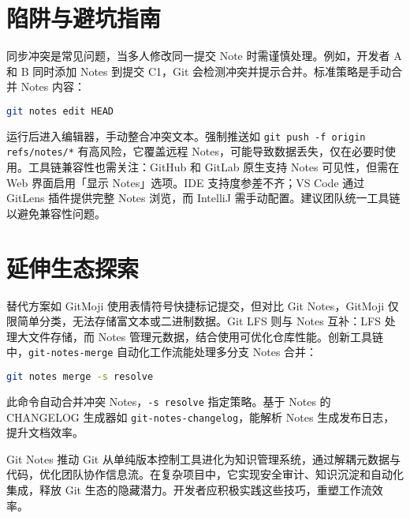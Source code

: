 \chapter{陷阱与避坑指南}
同步冲突是常见问题，当多人修改同一提交 Note 时需谨慎处理。例如，开发者 A 和 B 同时添加 Notes 到提交 C1，Git 会检测冲突并提示合并。标准策略是手动合并 Notes 内容：\par
\begin{lstlisting}[language=bash]
git notes edit HEAD
\end{lstlisting}
运行后进入编辑器，手动整合冲突文本。强制推送如 \texttt{git push -f origin refs/notes/*} 有高风险，它覆盖远程 Notes，可能导致数据丢失，仅在必要时使用。工具链兼容性也需关注：GitHub 和 GitLab 原生支持 Notes 可见性，但需在 Web 界面启用「显示 Notes」选项。IDE 支持度参差不齐；VS Code 通过 GitLens 插件提供完整 Notes 浏览，而 IntelliJ 需手动配置。建议团队统一工具链以避免兼容性问题。\par
\chapter{延伸生态探索}
替代方案如 GitMoji 使用表情符号快捷标记提交，但对比 Git Notes，GitMoji 仅限简单分类，无法存储富文本或二进制数据。Git LFS 则与 Notes 互补：LFS 处理大文件存储，而 Notes 管理元数据，结合使用可优化仓库性能。创新工具链中，\texttt{git-notes-merge} 自动化工作流能处理多分支 Notes 合并：\par
\begin{lstlisting}[language=bash]
git notes merge -s resolve
\end{lstlisting}
此命令自动合并冲突 Notes，\texttt{-s resolve} 指定策略。基于 Notes 的 CHANGELOG 生成器如 \texttt{git-notes-changelog}，能解析 Notes 生成发布日志，提升文档效率。\par
Git Notes 推动 Git 从单纯版本控制工具进化为知识管理系统，通过解耦元数据与代码，优化团队协作信息流。在复杂项目中，它实现安全审计、知识沉淀和自动化集成，释放 Git 生态的隐藏潜力。开发者应积极实践这些技巧，重塑工作流效率。\par

